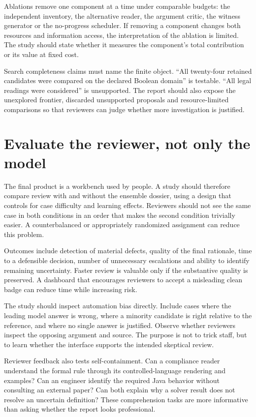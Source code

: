 \documentclass[12pt,a4paper,oneside,openany]{book}
\begin{document}
Ablations remove one component at a time under comparable budgets: the independent
inventory, the alternative reader, the argument critic, the witness generator or
the no-progress scheduler. If removing a component changes both resources and
information access, the interpretation of the ablation is limited. The study
should state whether it measures the component's total contribution or its value
at fixed cost.

Search completeness claims must name the finite object. ``All twenty-four retained
candidates were compared on the declared Boolean domain'' is testable. ``All legal
readings were considered'' is unsupported. The report should also expose the
unexplored frontier, discarded unsupported proposals and resource-limited
comparisons so that reviewers can judge whether more investigation is justified.

\section{Evaluate the reviewer, not only the model}
\label{merge:M09:11}


The final product is a workbench used by people. A study should therefore compare
review with and without the ensemble dossier, using a design that controls for
case difficulty and learning effects. Reviewers should not see the same case in
both conditions in an order that makes the second condition trivially easier.
A counterbalanced or appropriately randomized assignment can reduce this problem.

Outcomes include detection of material defects, quality of the final rationale,
time to a defensible decision, number of unnecessary escalations and ability to
identify remaining uncertainty. Faster review is valuable only if the substantive
quality is preserved. A dashboard that encourages reviewers to accept a misleading
clean badge can reduce time while increasing risk.

The study should inspect automation bias directly. Include cases where the
leading model answer is wrong, where a minority candidate is right relative to
the reference, and where no single answer is justified. Observe whether reviewers
inspect the opposing argument and source. The purpose is not to trick staff, but
to learn whether the interface supports the intended skeptical review.

Reviewer feedback also tests self-containment. Can a compliance reader understand
the formal rule through its controlled-language rendering and examples? Can an
engineer identify the required Java behavior without consulting an external paper?
Can both explain why a solver result does not resolve an uncertain definition?
These comprehension tasks are more informative than asking whether the report
looks professional.
\end{document}
